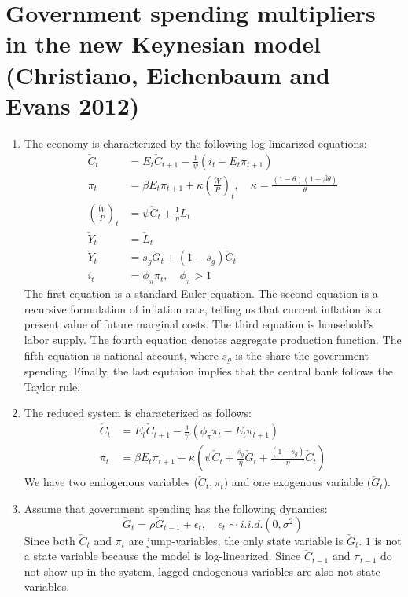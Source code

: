 \documentclass[11pt]{amsart}
\begin{document}
\section{Government spending multipliers in the new Keynesian model (Christiano, Eichenbaum and Evans 2012)}
\begin{enumerate}[label = (\alph*)]
	\item The economy is characterized by the following log-linearized equations:
	\begin{align*}
	 \check { C } _ { t } &= E _ { t } \check { C } _ { t + 1} - \frac { 1} { \psi } \left( i _ { t } - E _ { t } \pi _ { t + 1} \right)  \\ 
	 \pi _ { t } &= \beta E _ { t } \pi _ { t + 1} + \kappa \left( \frac { \check {W} } { P } \right)_t ,\quad \kappa = \frac { ( 1- \theta ) ( 1- \beta \theta ) } { \theta }  \\
	\left( \frac { \check{ W } } { P } \right) _ { t } &= \psi \check { C } _ { t } + \frac { 1} { \eta } L _ { t } \\
	\check { Y } _ { t } &= \check { L } _ { t } \\
	\check{ Y }_t &= s_g \check{G}_t + (1-s_g) \check{ C }_t \\
	i_t &= \phi_\pi \pi_t, \quad \phi_\pi > 1
	\end{align*}
	The first equation is a standard Euler equation. The second equation is a recursive formulation of inflation rate, telling us that current inflation is a present value of future marginal costs. The third equation is household's labor supply. The fourth equation denotes aggregate production function. The fifth equation is national account, where $s_g$ is the share the government spending. Finally, the last equtaion implies that the central bank follows the Taylor rule. 
	
	\item The reduced system is characterized as follows: 
	\begin{align*}
	\check{ C }_t &= E_t \check{ C }_{t+1} - \frac{1}{\psi} \left(\phi_\pi \pi_t - E_t\pi_{t+1} \right) \\
	\pi_t &= \beta E_t \pi_{t+1} + \kappa \left( \psi \check{ C }_t + \frac{s_g}{\eta} \check{ G}_t + \frac{(1-s_g)}{\eta} \check{ C }_t \right)
	\end{align*}
	We have two endogenous variables ($\check{ C }_t, \pi_t$) and one exogenous variable ($\check{ G}_t$). 
	
	\item Assume that government spending has the following dynamics: 
	\begin{equation*}
	\check { G } _ { t } = \rho \check { G } _ { t - 1} + \epsilon _ { t } ,\quad \epsilon _ { t } \sim i .i .d .\left( 0,\sigma ^ { 2} \right)
	\end{equation*} 
	Since both $\check{ C }_t$ and $\pi_t$ are jump-variables, the only state variable is $\check{ G}_t$.  $1$ is not a state variable because the model is log-linearized. Since $\check{ C }_{t-1}$ and $\pi_{t-1}$ do not show up in the system, lagged endogenous variables are also not state variables. 
	

\end{enumerate}
\end{document}
